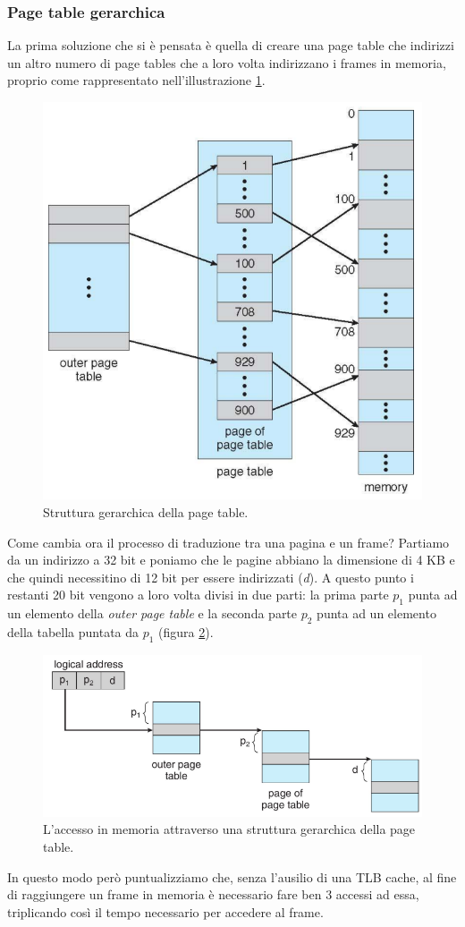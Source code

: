 \subsubsection{Page table gerarchica}
La prima soluzione che si è pensata è quella di creare una page table che indirizzi un altro numero di page tables che a loro volta indirizzano i frames in memoria, proprio come rappresentato nell'illustrazione \ref{fig:hierarchical_page_table}.
\begin{figure}[h]
    \centering
    \includegraphics[width = .45\textwidth]{../res/imgs/main memory/hierarchical_page_table.png}
    \caption{Struttura gerarchica della page table.}
    \label{fig:hierarchical_page_table}
\end{figure}
Come cambia ora il processo di traduzione tra una pagina e un frame? Partiamo da un indirizzo a 32 bit e poniamo che le pagine abbiano la dimensione di 4 KB e che quindi necessitino di 12 bit per essere indirizzati (\textit{d}). A questo punto i restanti 20 bit vengono a loro volta divisi in due parti: la prima parte $p_1$ punta ad un elemento della \textit{outer page table} e la seconda parte $p_2$ punta ad un elemento della tabella puntata da $p_1$ (figura \ref{fig:hierarchical_page_table_access}).
\begin{figure}[h]
    \centering
    \includegraphics[width = .6\textwidth]{../res/imgs/main memory/hierarchical_page_table_access.png}
    \caption{L'accesso in memoria attraverso una struttura gerarchica della page table.}
    \label{fig:hierarchical_page_table_access}
\end{figure}
In questo modo però puntualizziamo che, senza l'ausilio di una TLB cache, al fine di raggiungere un frame in memoria è necessario fare ben 3 accessi ad essa, triplicando così il tempo necessario per accedere al frame. 

